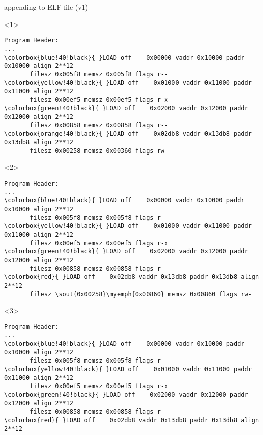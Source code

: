 \usetikzlibrary{arrows.meta,patterns}

\begin{frame}[fragile,label=appendElfA]{appending to ELF file (v1)}
\begin{onlyenv}<1>
\begin{Verbatim}[fontsize=\fontsize{9}{10}\selectfont,commandchars=\\\{\}]
Program Header:
...
\colorbox{blue!40!black}{ }LOAD off    0x00000 vaddr 0x10000 paddr 0x10000 align 2**12
       filesz 0x005f8 memsz 0x005f8 flags r--
\colorbox{yellow!40!black}{ }LOAD off    0x01000 vaddr 0x11000 paddr 0x11000 align 2**12
       filesz 0x00ef5 memsz 0x00ef5 flags r-x
\colorbox{green!40!black}{ }LOAD off    0x02000 vaddr 0x12000 paddr 0x12000 align 2**12
       filesz 0x00858 memsz 0x00858 flags r--
\colorbox{orange!40!black}{ }LOAD off    0x02db8 vaddr 0x13db8 paddr 0x13db8 align 2**12
       filesz 0x00258 memsz 0x00360 flags rw-
\end{Verbatim}
\end{onlyenv}
\begin{onlyenv}<2>
\begin{Verbatim}[fontsize=\fontsize{9}{10}\selectfont,commandchars=\\\{\}]
Program Header:
...
\colorbox{blue!40!black}{ }LOAD off    0x00000 vaddr 0x10000 paddr 0x10000 align 2**12
       filesz 0x005f8 memsz 0x005f8 flags r--
\colorbox{yellow!40!black}{ }LOAD off    0x01000 vaddr 0x11000 paddr 0x11000 align 2**12
       filesz 0x00ef5 memsz 0x00ef5 flags r-x
\colorbox{green!40!black}{ }LOAD off    0x02000 vaddr 0x12000 paddr 0x12000 align 2**12
       filesz 0x00858 memsz 0x00858 flags r--
\colorbox{red}{ }LOAD off    0x02db8 vaddr 0x13db8 paddr 0x13db8 align 2**12
       filesz \sout{0x00258}\myemph{0x00860} memsz 0x00860 flags rw-
\end{Verbatim}
\end{onlyenv}
\begin{onlyenv}<3>
\begin{Verbatim}[fontsize=\fontsize{9}{10}\selectfont,commandchars=\\\{\}]
Program Header:
...
\colorbox{blue!40!black}{ }LOAD off    0x00000 vaddr 0x10000 paddr 0x10000 align 2**12
       filesz 0x005f8 memsz 0x005f8 flags r--
\colorbox{yellow!40!black}{ }LOAD off    0x01000 vaddr 0x11000 paddr 0x11000 align 2**12
       filesz 0x00ef5 memsz 0x00ef5 flags r-x
\colorbox{green!40!black}{ }LOAD off    0x02000 vaddr 0x12000 paddr 0x12000 align 2**12
       filesz 0x00858 memsz 0x00858 flags r--
\colorbox{red}{ }LOAD off    0x02db8 vaddr 0x13db8 paddr 0x13db8 align 2**12

\end{Verbatim}
\end{onlyenv}
\end{frame}
